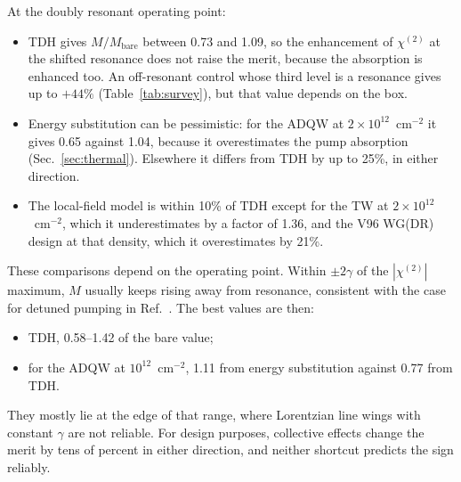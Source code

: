\documentclass[11pt]{article}
\newcommand{\chitwo}{\chi^{(2)}}
\begin{document}
At the doubly resonant operating point:
\begin{itemize}
\item TDH gives $M/M_\mathrm{bare}$ between 0.73 and 1.09, so the enhancement of $\chitwo$ at the shifted resonance does not raise the merit, because the absorption is enhanced too. An off-resonant control whose third level is a resonance gives up to $+44\%$ (Table~\ref{tab:survey}), but that value depends on the box.
\item Energy substitution can be pessimistic: for the ADQW at $2\times10^{12}$~cm$^{-2}$ it gives 0.65 against 1.04, because it overestimates the pump absorption (Sec.~\ref{sec:thermal}). Elsewhere it differs from TDH by up to 25\%, in either direction.
\item The local-field model is within 10\% of TDH except for the TW at $2\times10^{12}$~cm$^{-2}$, which it underestimates by a factor of 1.36, and the V96 WG(DR) design at that density, which it overestimates by 21\%.
\end{itemize}

These comparisons depend on the operating point. Within $\pm2\gamma$ of the $|\chitwo|$ maximum, $M$ usually keeps rising away from resonance, consistent with the case for detuned pumping in Ref.~\cite{OwnbyNL02}. The best values are then:
\begin{itemize}
\item TDH, 0.58--1.42 of the bare value;
\item for the ADQW at $10^{12}$~cm$^{-2}$, 1.11 from energy substitution against 0.77 from TDH.
\end{itemize}
They mostly lie at the edge of that range, where Lorentzian line wings with constant $\gamma$ are not reliable. For design purposes, collective effects change the merit by tens of percent in either direction, and neither shortcut predicts the sign reliably.
\end{document}
